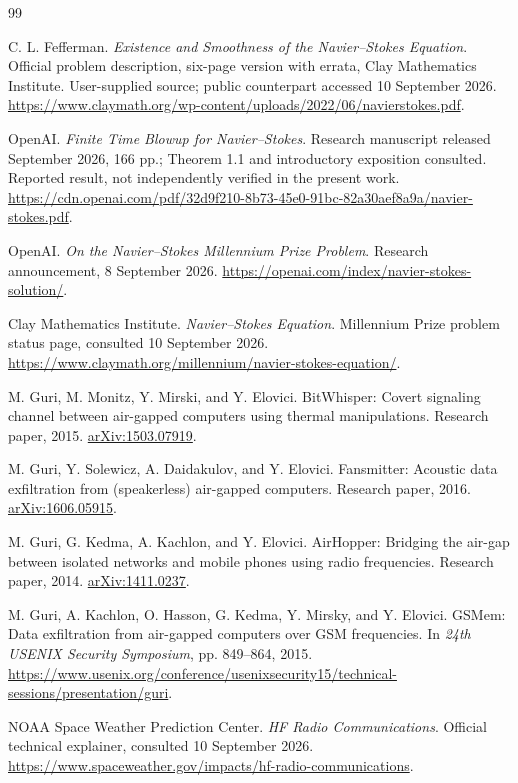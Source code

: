 \begin{thebibliography}{99}
\raggedright
{}
C. L. Fefferman. \emph{Existence and Smoothness of the Navier--Stokes Equation}. Official problem description, six-page version with errata, Clay Mathematics Institute. User-supplied source; public counterpart accessed 10 September 2026. \url{https://www.claymath.org/wp-content/uploads/2022/06/navierstokes.pdf}.

OpenAI. \emph{Finite Time Blowup for Navier--Stokes}. Research manuscript released September 2026, 166 pp.; Theorem 1.1 and introductory exposition consulted. Reported result, not independently verified in the present work. \url{https://cdn.openai.com/pdf/32d9f210-8b73-45e0-91bc-82a30aef8a9a/navier-stokes.pdf}.

OpenAI. \emph{On the Navier--Stokes Millennium Prize Problem}. Research announcement, 8 September 2026. \url{https://openai.com/index/navier-stokes-solution/}.

Clay Mathematics Institute. \emph{Navier--Stokes Equation}. Millennium Prize problem status page, consulted 10 September 2026. \url{https://www.claymath.org/millennium/navier-stokes-equation/}.

M. Guri, M. Monitz, Y. Mirski, and Y. Elovici. BitWhisper: Covert signaling channel between air-gapped computers using thermal manipulations. Research paper, 2015. \href{https://arxiv.org/abs/1503.07919}{arXiv:1503.07919}.

M. Guri, Y. Solewicz, A. Daidakulov, and Y. Elovici. Fansmitter: Acoustic data exfiltration from (speakerless) air-gapped computers. Research paper, 2016. \href{https://arxiv.org/abs/1606.05915}{arXiv:1606.05915}.

M. Guri, G. Kedma, A. Kachlon, and Y. Elovici. AirHopper: Bridging the air-gap between isolated networks and mobile phones using radio frequencies. Research paper, 2014. \href{https://arxiv.org/abs/1411.0237}{arXiv:1411.0237}.

M. Guri, A. Kachlon, O. Hasson, G. Kedma, Y. Mirsky, and Y. Elovici. GSMem: Data exfiltration from air-gapped computers over GSM frequencies. In \emph{24th USENIX Security Symposium}, pp. 849--864, 2015. \url{https://www.usenix.org/conference/usenixsecurity15/technical-sessions/presentation/guri}.

NOAA Space Weather Prediction Center. \emph{HF Radio Communications}. Official technical explainer, consulted 10 September 2026. \url{https://www.spaceweather.gov/impacts/hf-radio-communications}.


\end{thebibliography}
